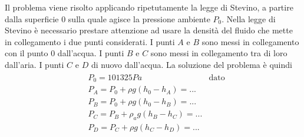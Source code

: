 \documentclass[letterpaper,10pt,italian]{jupyterBook}
\begin{document}
\sphinxAtStartPar
{} Il problema viene risolto applicando ripetutamente la legge di Stevino,
a partire dalla superficie \(0\) sulla quale agisce la pressione ambiente
\(P_0\). Nella legge di Stevino è necessario prestare attenzione ad usare
la densità del fluido che mette in collegamento i due punti considerati.
I punti \(A\) e \(B\) sono messi in collegamento con il punto \(0\)
dall’acqua. I punti \(B\) e \(C\) sono messi in collegamento tra di loro
dall’aria. I punti \(C\) e \(D\) di nuovo dall’acqua. La soluzione del
problema è quindi
\begin{equation*}
\begin{split}\begin{aligned}
 & P_0 = 101325 Pa & \text{dato} \\
 & P_A = P_0 + \rho g (h_0 - h_A) = ... \\
 & P_B = P_0 + \rho g (h_0 - h_B) = ... \\
 & P_C = P_B + \rho_a g (h_B - h_C) = ... \\
 & P_D = P_C + \rho g (h_C - h_D) = ... 
\end{aligned}\end{split}
\end{equation*}
\sphinxstepscope
\end{document}
